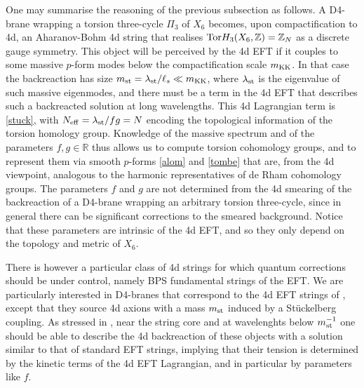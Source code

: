 \documentclass[11pt]{article}
\newcommand{\IR}{\mathbb{R}}
\newcommand{\IZ}{\mathbb{Z}}
\begin{document}
One may summarise the reasoning of the previous subsection as follows. A D4-brane wrapping a torsion three-cycle $\Pi_3$ of $X_6$ becomes, upon compactification to 4d, an Aharanov-Bohm 4d string that realises ${\rm Tor} H_3(X_6, \IZ) = \IZ_N$ as a discrete gauge symmetry. This object will be perceived by the 4d EFT if it couples to some massive $p$-form modes below the compactification scale $m_{\rm KK}$. In that case the backreaction has size $m_{\rm st} = \lambda_{\rm st}/\ell_s \ll m_{\rm KK}$, where $\lambda_{\rm st}$ is the eigenvalue of such massive eigenmodes, and there must be a term in the 4d EFT that describes such a backreacted solution at long wavelengths. This 4d Lagrangian term is \eqref{stuck}, with $N_{\rm eff} = \lambda_{\rm st}/fg = N$ encoding the topological information of the torsion homology group. Knowledge of the massive spectrum and of the parameters $f, g \in \IR$ thus allows us to compute torsion cohomology groups, and to represent them via smooth $p$-forms \eqref{alom} and \eqref{tombe} that are, from the 4d viewpoint, analogous to the harmonic representatives of de Rham cohomology groups. The parameters $f$ and $g$ are not determined from the 4d smearing of the backreaction of a D4-brane wrapping an arbitrary torsion three-cycle, since in general there can be significant corrections to the smeared background. Notice that these parameters are intrinsic of the 4d EFT, and so they only depend on the topology and metric of $X_6$. 

There is however a particular class of 4d strings for which quantum corrections should be under control, namely BPS fundamental strings of the EFT. We are particularly interested in D4-branes that correspond to the 4d EFT strings of \cite{Lanza:2020qmt,Lanza:2021udy,Lanza:2022zyg}, except that they source 4d axions with a mass $m_{\rm st}$ induced by a St\"uckelberg coupling. As stressed in \cite{Lanza:2020qmt}, near the string core and at wavelenghts below $m_{\rm st}^{-1}$ one should be able to describe the 4d backreaction of these objects with a solution similar to that of standard EFT strings, implying that their tension is determined by the kinetic terms of the 4d EFT Lagrangian, and in particular by parameters like $f$. 
\end{document}
